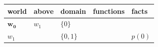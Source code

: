 \documentclass[border=5pt]{standalone}
\begin{document}
\begin{tabular}{lllll}
world & above & domain & functions & facts \\
\hline
$\mathbf{w_{0}}$ & $w_{1}$ & $\{0\}$ &  &  \\
$w_{1}$ &  & $\{0, 1\}$ &  & $p(0)$ \\
\end{tabular}
\end{document}
